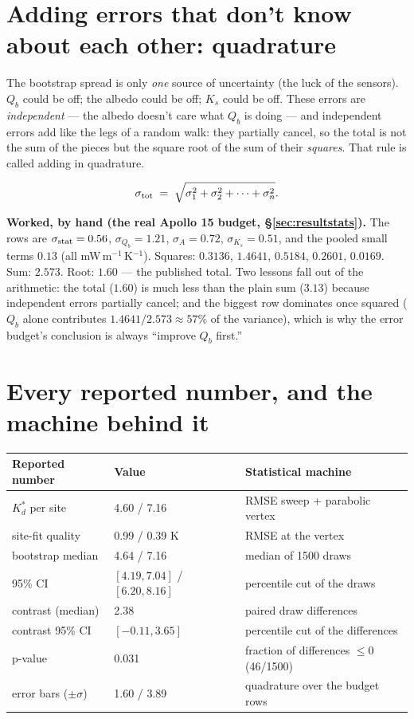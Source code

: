 \documentclass[11pt]{report}
\begin{document}
\section{Adding errors that don't know about each other:
quadrature}\label{sec:quadzero}

\begin{plain}
The bootstrap spread is only \emph{one} source of uncertainty (the luck of the
sensors). $Q_b$ could be off; the albedo could be off; $K_s$ could be off.
These errors are \emph{independent} --- the albedo doesn't care what $Q_b$ is
doing --- and independent errors add like the legs of a random walk: they
partially cancel, so the total is not the sum of the pieces but the square
root of the sum of their \emph{squares}. That rule is called adding in
quadrature.
\end{plain}

\[
\sigma_{\rm tot} \;=\; \sqrt{\sigma_1^2 + \sigma_2^2 + \cdots + \sigma_n^2}.
\]

\noindent\textbf{Worked, by hand (the real Apollo 15 budget,
\S\ref{sec:resultstats}).} The rows are $\sigma_{\rm stat}=0.56$,
$\sigma_{Q_b}=1.21$, $\sigma_{A}=0.72$, $\sigma_{K_s}=0.51$, and the pooled
small terms $0.13$ (all mW\,m$^{-1}$\,K$^{-1}$). Squares: $0.3136$, $1.4641$,
$0.5184$, $0.2601$, $0.0169$. Sum: $2.573$. Root: $\boxed{1.60}$ --- the
published total. Two lessons fall out of the arithmetic: the total ($1.60$) is
much less than the plain sum ($3.13$) because independent errors partially
cancel; and the biggest row dominates once squared ($Q_b$ alone contributes
$1.4641/2.573 \approx 57\%$ of the variance), which is why the error budget's
conclusion is always ``improve $Q_b$ first.''

\section{Every reported number, and the machine behind it}

\begin{center}\small
\begin{tabular}{@{}lll@{}}
\toprule
Reported number & Value & Statistical machine \\
\midrule
$K_d^{*}$ per site & 4.60 / 7.16 & RMSE sweep + parabolic vertex \\
site-fit quality & 0.99 / 0.39 K & RMSE at the vertex \\
bootstrap median & 4.64 / 7.16 & median of 1500 draws \\
95\% CI & $[4.19,7.04]$ / $[6.20,8.16]$ & percentile cut of the draws \\
contrast (median) & 2.38 & paired draw differences \\
contrast 95\% CI & $[-0.11, 3.65]$ & percentile cut of the differences \\
p-value & 0.031 & fraction of differences $\leq 0$ (46/1500) \\
error bars ($\pm\sigma$) & 1.60 / 3.89 & quadrature over the budget rows \\
\bottomrule
\end{tabular}
\end{center}
\end{document}
